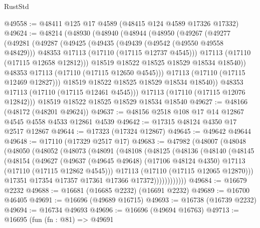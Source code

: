 \begin{lexlean}{RustStd}
\begin{coremodule}
@49558 := @48411 @125 @17 @4589 (@48415 @124 @4589 @17326 @17332)
@49624 := @48214
    (@48930
      (@48940
        (@48944
          (@48950
            (@49267
              (@49277
                (@49281
                  (@49287
                    (@49425
                      (@49435
                        (@49439 (@49542 (@49550 @49558 @48429)))
                        @48353
                        @17113
                        (@17110 (@17115 @12737 @4545)))
                      @17113
                      (@17110 (@17115 @12658 @12812)))
                    @18519
                    @18522
                    @18525
                    @18529
                    @18534
                    @18540))
                @48353
                @17113
                (@17110 (@17115 @12650 @4545)))
              @17113
              (@17110 (@17115 @12469 @12827)))
            @18519
            @18522
            @18525
            @18529
            @18534
            @18540))
        @48353
        @17113
        (@17110 (@17115 @12461 @4545)))
      @17113
      (@17110 (@17115 @12076 @12842)))
    @18519
    @18522
    @18525
    @18529
    @18534
    @18540
@49627 := @48166 (@48172 (@48201 @49624))
@49637 := @48156 @2518 @108 @17 @14 @12867 @4545 @4558 @4533 @12861 @4539
@49642 := @17315 @48124 @4350 @17 @2517 @12867
@49644 := @17323 (@17324 @12867)
@49645 := @49642 @49644
@49648 := @17110 (@17329 @2517 @17)
@49683 := @47982
    (@48007
      (@48048
        (@48050
          (@48052
            (@48073
              (@48091
                (@48108
                  (@48125
                    (@48136
                      (@48140
                        (@48145
                          (@48154
                            (@49627
                              (@49637
                                (@49645 @49648)
                                (@17106 @48124 @4350)
                                @17113
                                (@17110 (@17115 @12862 @4545)))
                              @17113
                              (@17110 (@17115 @12065 @12870)))
                            @17351
                            @17354
                            @17357
                            @17361
                            @17366
                            @17372))))))))))))
@49684 := @16679 @2232
@49688 := @16681 (@16685 @2232) (@16691 @2232)
@49689 := @16700 @46405
@49691 := @16696 (@49689 @16715)
@49693 := @16738 (@16739 @2232)
@49694 := @16734 @49693
@49696 := @16696 (@49694 @16763)
@49713 := @16695
    (fun (fn : @81) =>
    @49691

\end{coremodule}
\end{lexlean}
